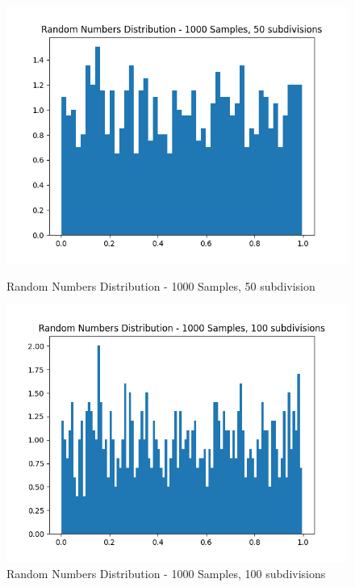 \documentclass[11pt]{article}
\begin{document}
\begin{figure}[H]
    \centering
    \begin{minipage}{0.48\textwidth}
        \centering
        \includegraphics[width=\textwidth]{Random Numbers Distribution - 1000 Samples, 50 subdivisions.png}
        \caption{Random Numbers Distribution - 1000 Samples, 50 subdivision}
        \label{fig:3}
    \end{minipage}\hfill
    \begin{minipage}{0.48\textwidth}
        \centering
        \includegraphics[width=\textwidth]{Random Numbers Distribution - 1000 Samples, 100 subdivisions.png}
        \caption{Random Numbers Distribution - 1000 Samples, 100 subdivisions}
        \label{fig:4}
    \end{minipage}
\end{figure}
\end{document}
